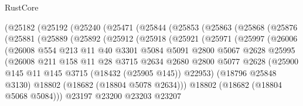 \begin{lexlean}{RustCore}
\begin{coremodule}
      (@25182
        (@25192
          (@25240
            (@25471
              (@25844
                (@25853
                  (@25863
                    (@25868
                      (@25876
                        (@25881
                          (@25889
                            (@25892
                              (@25912
                                (@25918
                                  (@25921
                                    (@25971
                                      (@25997
                                        (@26006
                                          (@26008
                                            @554
                                            @213
                                            @11
                                            @40
                                            @3301
                                            @5084
                                            @5091
                                            @2800
                                            @5067
                                            @2628
                                            @25995
                                            (@26008
                                              @211
                                              @158
                                              @11
                                              @28
                                              @3715
                                              @2634
                                              @2680
                                              @2800
                                              @5077
                                              @2628
                                              (@25900
                                                @145
                                                @11
                                                @145
                                                @3715
                                                (@18432 (@25905 @145))
                                                @22953)
                                              (@18796 @25848 @3130)
                                              @18802
                                              (@18682 (@18804 @5078 @2634)))
                                            @18802
                                            (@18682 (@18804 @5068 @5084)))
                                          @23197
                                          @23200
                                          @23203
                                          @23207

\end{coremodule}
\end{lexlean}

